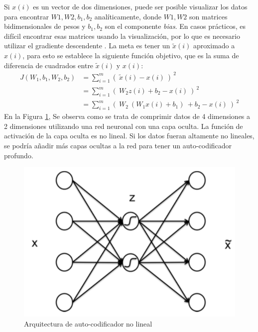     Si $x(i)$ es un vector de dos dimensiones, puede ser posible visualizar los datos para encontrar $W1, W2, b_1, b_2$ analíticamente, donde $W1, W2$ son matrices bidimensionales de pesos y $b_1, b_2$ son el componente \textit{bias}. En casos prácticos, es difícil encontrar esas matrices usando la visualización, por lo que es necesario utilizar el gradiente descendente \cite{stochastic-gradient-tricks}. La meta es tener un $\tilde{x}(i)$ aproximado a $x(i)$, para esto se establece la siguiente función objetivo, que es la suma de diferencia de cuadrados entre $\tilde{x}(i)$ y $x(i)$:
    \begin{equation}
    \begin{aligned}
     J(W_1,b_1,W_2,b_2) & = \sum_{i=1}^m\left(\ \tilde{x}(i)-x(i)\ \right )^{\ 2} \\
      & = \sum_{i=1}^m\left(\ W_2z(i) + b_2-x(i)\ \right )^{\ 2}\\
     & = \sum_{i=1}^m\left(\ W_2 \ (W_1x(i)+b_1) \ + b_2-x(i)\ \right )^{\ 2}
    \end{aligned}
    \end{equation}
    En la Figura \ref{fig:aenco2}, Se observa como se trata de comprimir datos de 4 dimensiones a 2 dimensiones utilizando una red neuronal con una capa oculta. La función de activación de la capa oculta es no lineal. Si los datos fueran altamente no lineales, se podría añadir más capas ocultas a la red para tener un auto-codificador profundo.
    \begin{figure}[htp]
        \centering
        \includegraphics[scale=0.49]{chapter3/aenco2.png}
        \caption{Arquitectura de auto-codificador no lineal}
        \label{fig:aenco2}
    \end{figure}

